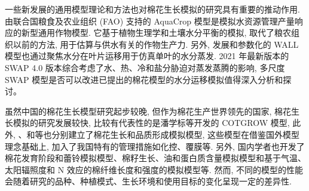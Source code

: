 \documentclass[a4paper,zihao=5]{ctexbook}
\begin{document}
一些新发展的通用模型理论和方法也对棉花生长模拟的研究具有重要的推动作用.
由联合国粮食及农业组织 (FAO) 支持的 AquaCrop 模型是模拟水资源管理产量响应的新型通用作物模型\cite{tan2018}.
它基于植物生理学和土壤水分平衡的模拟, 取代了粮农组织以前的方法, 用于估算与供水有关的作物生产力.
另外, 发展和参数化的 WALL 模型也通过聚焦水分在叶片运移用于仿真单叶的水分蒸发\cite{pachepsky2009}.
2021 年最新版本的 SWAP 4.0 版本\cite{swap2021}综合考虑了水、热、冷和盐分胁迫对蒸发蒸腾的影响, 多尺度 SWAP 模型是否可以改进已提出的棉花模型的水分运移模拟值得深入分析和探讨。

虽然中国的棉花生长模型研究起步较晚, 但作为棉花生产世界领先的国家,
棉花生长模拟的研究发展较快, 比较有代表性的是潘学标等开发的 COTGROW\cite{pan1996} 模型, 此外, \citet{zhang2003}、\citet{chen2006}和\citet{ma2004}等也分别建立了棉花生长和品质形成模拟模型, 这些模型在借鉴国外模型理念基础上, 加入了我国特有的管理措施如化控、覆膜等.
另外, 国内学者也开发了棉花发育阶段和蕾铃模拟模型\cite{ma2005}、棉籽生长、油和蛋白质含量模拟模型\cite{li2009}和基于气温、太阳辐照度和 N 效应的棉纤维长度和强度的模拟模型\cite{zhao2012}等.
然而, 不同的模型的性能会随着研究的品种、种植模式、生长环境和使用目标的变化呈现一定的差异性.
\end{document}
